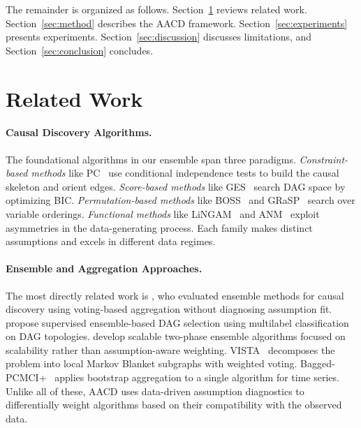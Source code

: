 \documentclass{article}
\newcommand{\aacd}{\textsc{AACD}}
\begin{document}
The remainder is organized as follows. Section~\ref{sec:related} reviews related work. Section~\ref{sec:method} describes the \aacd{} framework. Section~\ref{sec:experiments} presents experiments. Section~\ref{sec:discussion} discusses limitations, and Section~\ref{sec:conclusion} concludes.

\section{Related Work}
\label{sec:related}

\paragraph{Causal Discovery Algorithms.}
The foundational algorithms in our ensemble span three paradigms. \emph{Constraint-based methods} like PC~\citep{spirtes2000causation} use conditional independence tests to build the causal skeleton and orient edges. \emph{Score-based methods} like GES~\citep{chickering2002optimal} search DAG space by optimizing BIC. \emph{Permutation-based methods} like BOSS~\citep{andrews2023boss} and GRaSP~\citep{lam2022grasp} search over variable orderings. \emph{Functional methods} like LiNGAM~\citep{shimizu2006lingam} and ANM~\citep{hoyer2008nonlinear} exploit asymmetries in the data-generating process. Each family makes distinct assumptions and excels in different data regimes.

\paragraph{Ensemble and Aggregation Approaches.}
The most directly related work is \citet{saldanha2020ensemble}, who evaluated ensemble methods for causal discovery using voting-based aggregation without diagnosing assumption fit. \citet{mio2025supervised} propose supervised ensemble-based DAG selection using multilabel classification on DAG topologies. \citet{guo2021scalable} develop scalable two-phase ensemble algorithms focused on scalability rather than assumption-aware weighting. VISTA~\citep{sun2026efficient} decomposes the problem into local Markov Blanket subgraphs with weighted voting. Bagged-PCMCI+~\citep{debeire2024bootstrap} applies bootstrap aggregation to a single algorithm for time series. Unlike all of these, \aacd{} uses data-driven assumption diagnostics to differentially weight algorithms based on their compatibility with the observed data.
\end{document}
